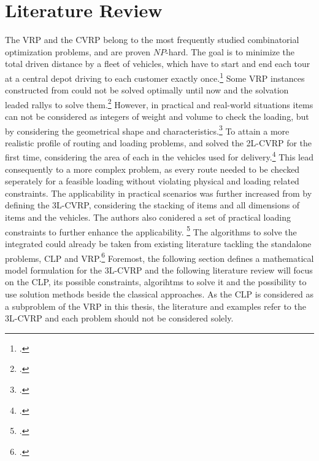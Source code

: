 \chapter{Literature Review}
\label{chap:literature_review}

The \gls{VRP} and the \gls{CVRP} belong to the most frequently studied combinatorial
optimization problems, and are proven $NP$-hard. The goal is to minimize the total driven distance
by a fleet of vehicles, which have to start and end each tour at a central depot driving to each
customer exactly once.\footcite[cf.][p.1]{gendreau_tabu_2008} Some \gls{VRP}
instances constructed from \cite{solomon_algorithms_1987} could not be solved optimally until now and the
solvation leaded rallys to solve them.\footcite[cf.][]{solomon_algorithms_1987} However,
in practical and real-world situations items can not be considered as integers of weight
and volume to check the loading, but by considering the geometrical shape and characteristics.\footcite[cf.][p.1]{gendreau_tabu_2008}
To attain a more realistic profile of routing and loading problems, \cite{iori_exact_2004} and \cite{gendreau_tabu_2008}
solved the \gls{2L-CVRP} for the first time, considering the area of each in
the vehicles used for delivery.\footcites()()[cf.][]{iori_exact_2004}[cf.][]{gendreau_tabu_2008}
This lead consequently to a more complex problem, as every route needed to be checked seperately for
a feasible loading without violating physical and loading related constraints.
The applicability in practical scenarios was further increased from \cite{gendreau_tabu_2006} by defining
the \gls{3L-CVRP}, considering the stacking of items and all dimensions of items and the vehicles. The authors
also conidered a set of practical loading constraints to further enhance the applicability. \footcite[cf.][]{gendreau_tabu_2006}
The algorithms to solve the integrated could already be taken from existing literature tackling the standalone
problems, \gls{CLP} and \gls{VRP}.\footcite[cf.][]{pisinger_heuristics_2002} Foremost, the following section defines
a mathematical model formulation for the \gls{3L-CVRP} and the following literature review will focus
on the \gls{CLP}, its possible constraints, algorihtms to solve it and the possibility to use solution
methods beside the classical approaches. As the \gls{CLP} is considered as a subproblem of the \gls{VRP}
in this thesis, the literature and examples refer to the \gls{3L-CVRP} and each problem should not be
considered solely.



